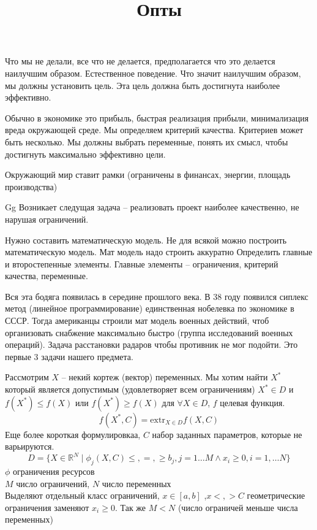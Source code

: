 \documentclass[14pt]{extarticle}
\title{Опты}
\author{}
\date{}
\begin{document}
	\maketitle
	\section{}
	Что мы не делали, все что не делается, предполагается
	что это делается наилучшим образом. Естественное поведение.
	Что значит наилучшим образом, мы должны установить цель.
	Эта цель должна быть достигнута наиболее эффективно.
	
	Обычно в экономике это прибыль, быстрая реализация прибыли,
	минимализация вреда окружающей среде. Мы определяем критерий качества.
	Критериев может быть несколько. Мы должны выбрать переменные,
	понять их смысл, чтобы достигнуть максимально эффективно цели.

	Окружающий мир ставит рамки (ограничены
	в финансах, энергии, площадь производства)

Gg	Возникает следущая задача -- реализовать проект
	наиболее качественно, не нарушая ограничений.

	Нужно составить математическую модель. Не для всякой
	можно построить математическую модель. Мат модель надо строить аккуратно
	Определить главные и второстепенные элементы. Главные элементы --
	ограничения, критерий качества, переменные. 

	Вся эта бодяга появилась в середине прошлого века. В 38 году
	появился сиплекс метод (линейное программирование) единственная
	нобелевка по экономике в СССР. Тогда американцы строили мат модель
	военных действий, чтоб организовать снабжение максимально быстро 
	(группа исследований военных операций). Задача расстановки радаров
	чтобы противник не мог подойти. Это первые 3 задачи нашего предмета.

	Рассмотрим $X$ -- некий кортеж (вектор) переменных. 
	Мы хотим найти  $X^{*}$ который является допустимым
	(удовлетворяет всем ограничениям) $X^{*} \in D$ и 
	$f(X^{*}) \le f(X)$ или $f(X^{*}) \ge f(X)$ для $\forall  X \in D$, 
	$f$ целевая функция.
	\begin{equation}
		f(X^{*},C) = \text{extr}_{X \in D} f(X,C)
	\end{equation}
	Еще более короткая формулировкаа, $C$ набор заданных параметров,
	которые не варьируются.
	\begin{equation}
		D= \{X \in \mathbb{R}^{N} \mid \phi_{j}(X,C) \le ,=,\ge b_{j},j=1 \dots M \land x_{i} \ge 0,i = 1,\dots N\}
	\end{equation}
	$\phi$ ограничения ресурсов\\
	 $M$ число ограничений,  $N$ число переменных \\
	 Выделяют отдельный класс ограничений,  $x \in [a,b]$ ,$x <,> C$
	 геометрические ограничения заменяют  $x_{i}\ge 0$. Так же
	 $M < N$ (число ограничей меньше числа  переменных)
\end{document}
